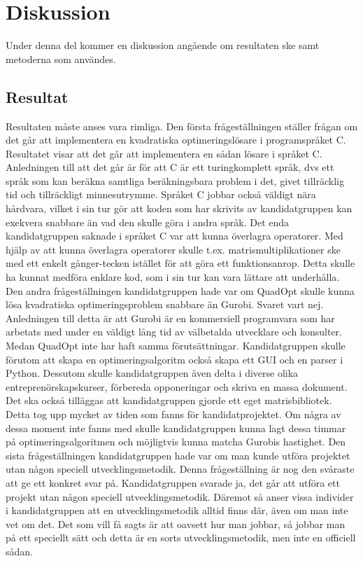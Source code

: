 \section{Diskussion}
Under denna del kommer en diskussion angående om resultaten ske samt metoderna som användes.

\subsection{Resultat}
Resultaten måste anses vara rimliga. Den första frågeställningen ställer frågan om det går att implementera en kvadratiska optimeringslösare i programspråket C. Resultatet visar att det går att implementera en sådan lösare i språket C. Anledningen till att det går är för att C är ett turingkomplett språk, dvs ett språk som kan beräkna samtliga beräkningsbara problem i det, givet tillräcklig tid och tillräckligt minnesutrymme. Språket C jobbar också väldigt nära hårdvara, vilket i sin tur gör att koden som har skrivits av kandidatgruppen kan exekvera snabbare än vad den skulle göra i andra språk. Det enda kandidatgruppen saknade i språket C var att kunna överlagra operatorer. Med hjälp av att kunna överlagra operatorer skulle t.ex. matrismultiplikationer ske med ett enkelt gånger-tecken istället för att göra ett funktionsanrop. Detta skulle ha kunnat medföra enklare kod, som i sin tur kan vara lättare att underhålla. 
\newline
\newline
Den andra frågeställningen kandidatgruppen hade var om QuadOpt skulle kunna lösa kvadratiska optimeringsproblem snabbare än Gurobi. Svaret vart nej. Anledningen till detta är att Gurobi är en kommersiell programvara som har arbetats med under en väldigt lång tid av välbetalda utvecklare och konsulter. Medan QuadOpt inte har haft samma förutsättningar. Kandidatgruppen skulle förutom att skapa en optimeringsalgoritm också skapa ett GUI och en parser i Python. Dessutom skulle kandidatgruppen även delta i diverse olika entreprenörskapskurser, förbereda opponeringar och skriva en massa dokument. Det ska också tilläggas att kandidatgruppen gjorde ett eget matrisbibliotek. Detta tog upp mycket av tiden som fanns för kandidatprojektet. Om några av dessa moment inte fanns med skulle kandidatgruppen kunna lagt dessa timmar på optimeringsalgoritmen och möjligtvis kunna matcha Gurobis hastighet.
\newline
\newline
Den sista frågeställningen kandidatgruppen hade var om man kunde utföra projektet utan någon speciell utvecklingsmetodik. Denna frågeställning är nog den svåraste att ge ett konkret svar på. Kandidatgruppen svarade ja, det går att utföra ett projekt utan någon speciell utvecklingsmetodik. Däremot så anser vissa individer i kandidatgruppen att en utvecklingsmetodik alltid finns där, även om man inte vet om det. Det som vill få sagts är att oavsett hur man jobbar, så jobbar man på ett speciellt sätt och detta är en sorts utvecklingsmetodik, men inte en officiell sådan.

